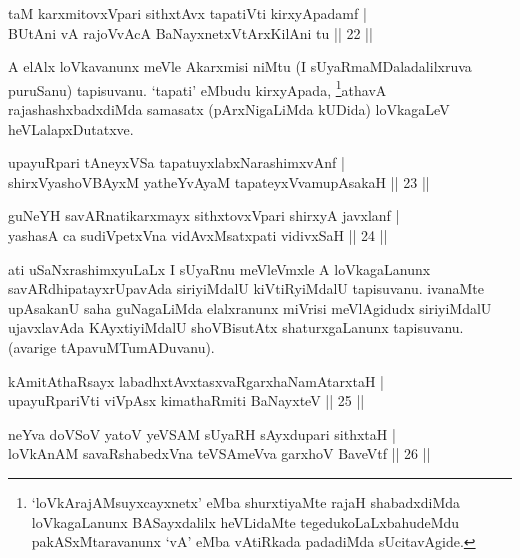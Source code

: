 
\begin{shl}
taM karxmitovxVpari sithxtAvx tapatiVti kirxyApadamf | \\
BUtAni vA rajoVvAcA BaNayxnetxV\s tArxKilAni tu \hfill ||  22 || 
\end{shl}

\begin{artha} 
A elAlx loVkavanunx meVle Akarxmisi niMtu (I sUyaRmaMDaladalilxruva 
puruSanu) tapisuvanu. `tapati' eMbudu kirxyApada, 
\footnote[2]{`loVkArajAMsuyxcayxnetx' eMba shurxtiyaMte rajaH 
shabadxdiMda loVkagaLanunx BASayxdalilx heVLidaMte 
tegedukoLaLxbahudeMdu pakASxMtaravanunx `vA' eMba vAtiRkada padadiMda 
sUcitavAgide.}athavA 
rajashashxbadxdiMda samasatx (pArxNigaLiMda kUDida) loVkagaLeV heVLalapxDutatxve.
\end{artha}

\begin{shl}
upayuRpari tAneyxVSa tapatuyxlabxNarashimxvAnf | \\
shirxVyashoVBAyxM yatheYvAyaM tapateyxVvamupAsakaH \hfill ||  23 ||
\end{shl}

\begin{shl}
guNeYH savARnatikarxmayx sithxtovxVpari shirxyA javxlanf | \\
yashasA ca sudiVpetxVna vidAvxMsatxpati vidivxSaH \hfill ||  24 || 
\end{shl}

\begin{artha} 
ati uSaNxrashimxyuLaLx I sUyaRnu meVleVmxle A loVkagaLanunx 
savARdhipatayxrUpavAda siriyiMdalU kiVtiRyiMdalU tapisuvanu. ivanaMte 
upAsakanU saha guNagaLiMda elalxranunx miVrisi meVlAgidudx siriyiMdalU 
ujavxlavAda KAyxtiyiMdalU shoVBisutAtx shaturxgaLanunx tapisuvanu. 
(avarige tApavuMTumADuvanu).
\end{artha}


\begin{shl}
kAmitAthaRsayx labadhxtAvxtasxvaRgarxhaNamAtarxtaH | \\
upayuRpariVti viVpAsx kimathaRmiti BaNayxteV \hfill ||  25 || 
\end{shl}

\begin{shl}
neYva doVSoV yatoV yeVSAM sUyaRH sAyxdupari sithxtaH | \\
loVkAnAM savaRshabedxVna teVSAmeVva garxhoV BaveVtf \hfill ||  26 || 
\end{shl}

